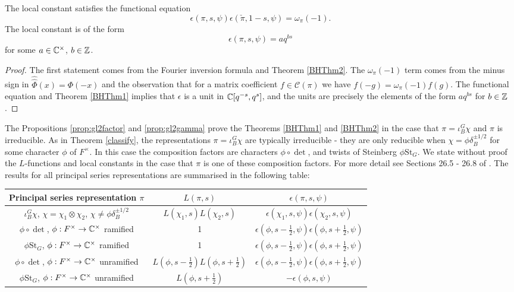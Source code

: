 \begin{cor}
    The local constant satisfies the functional equation
    $$\epsilon(\pi,s,\psi)\epsilon(\check{\pi},1-s,\psi) = \omega_\pi(-1).$$
    The local constant is of the form $$\epsilon(\pi,s,\psi) = aq^{bs}$$ for some $a \in \mathbb{C}^\times$, $b \in \mathbb{Z}$. 
\end{cor}
\begin{proof}
    The first statement comes from the Fourier inversion formula and Theorem \ref{BHThm2}. The $\omega_\pi(-1)$ term comes from the minus sign in $\hat{\hat{\Phi}}(x)=\Phi(-x)$ and the observation that for a matrix coefficient $f \in \mathcal C(\pi)$ we have $f(-g)=\omega_\pi(-1)f(g)$. The functional equation and Theorem \ref{BHThm1} implies that $\epsilon$ is a unit in $\mathbb{C}[q^{-s},q^s]$, and the units are precisely the elements of the form $aq^{bs}$ for $b \in \mathbb{Z}$.
\end{proof}

The Propositions \ref{prop:gl2factor} and \ref{prop:gl2gamma} prove the Theorems \ref{BHThm1} and \ref{BHThm2} in the case that $\pi = \iota_B^G \chi$ and $\pi$ is irreducible. As in Theorem \ref{classify}, the representations $\pi = \iota_B^G \chi$ are typically irreducible - they are only reducible when $\chi = \phi \delta_B^{\pm 1/2}$ for some character $\phi$ of $F^\times$. In this case the composition factors are characters $\phi \circ \det$, and twists of Steinberg $\phi \mathrm{St}_G$. We state without proof the $L$-functions and local constants in the case that $\pi$ is one of these composition factors. For more detail see Sections 26.5 - 26.8 of \cite{BH1}. The results for all principal series representations are summarised in the following table:

\begin{center}
    \begin{tabular}{ |c|c|c| }
     \hline
     Principal series representation $\pi$ & $L(\pi,s)$ & $\epsilon(\pi,s,\psi)$ \\ \hline
     $\iota_B^G \chi$, $\chi=\chi_1\otimes \chi_2$, $\chi \neq \phi \delta_B^{\pm 1/2}$ & $L(\chi_1,s)L(\chi_2,s)$ & $\epsilon(\chi_1,s,\psi)\epsilon(\chi_2,s,\psi)$ \\ 
     $\phi \circ \det$, $\phi :F^\times \to \mathbb{C}^\times$ ramified & 1 & $\epsilon(\phi,s-\frac{1}{2},\psi)\epsilon(\phi,s+\frac{1}{2},\psi)$ \\ 
     $\phi \mathrm{St}_G$, $\phi :F^\times \to \mathbb{C}^\times$ ramified & 1 & $\epsilon(\phi,s-\frac{1}{2},\psi)\epsilon(\phi,s+\frac{1}{2},\psi)$ \\  
     $\phi \circ \det$, $\phi :F^\times \to \mathbb{C}^\times$ unramified & $L(\phi,s-\frac{1}{2})L(\phi,s+\frac{1}{2})$ & $\epsilon(\phi,s-\frac{1}{2},\psi)\epsilon(\phi,s+\frac{1}{2},\psi)$ \\ 
     $\phi \mathrm{St}_G$, $\phi :F^\times \to \mathbb{C}^\times$ unramified & $L(\phi,s+\frac{1}{2})$ & $-\epsilon(\phi,s,\psi)$ \\     
     \hline
    \end{tabular}
\end{center}

